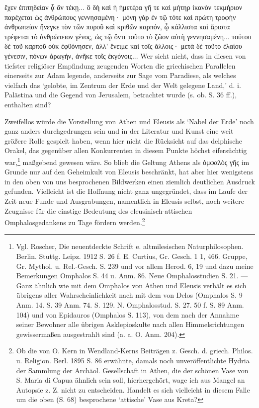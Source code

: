 \documentclass[a4paper, 11pt, oneside]{article}
\begin{document}
ἔχεν ἐπιτηδείαν ᾇ ἂν τέκῃ... ὃ δὴ καὶ ἡ ἡμετέρα γῆ τε καὶ μήτηρ ἱκανὸν τεκμήριον παρέχεται ὡς ἀνθρώπους γεννησαμένη· μόνη γὰρ ἐν τῷ τότε καὶ πρώτη τροφὴν ἀνθρωπείαν ἤνεγκε τὸν τῶν πυροῦ καὶ κριθῶν καρπόν, ᾧ κάλλιστα καὶ ἄριστα τρέφεται τὸ ἀνθρώπειον γένος, ὡς τῷ ὄντι τοῦτο τὸ ζῶον αὐτὴ γεννησαμένη... τούτου δὲ τοῦ καρποῦ οὐκ ἐφθόνησεν, ἀλλ' ἔνειμε καὶ τοῖς ἄλλοις· μετὰ δὲ τοῦτο ἐλαίου γένεσιν, πόνων ἀρωγήν, ἀνῆκε τοῖς ἐκγόνοις... Wer sieht nicht, dass in diesen von tiefster religiöser Empfindung zeugenden Worten die griechischen Parallelen einerseits zur Adam legende, anderseits zur Sage vom Paradiese, als welches vielfach das `gelobte, im Zentrum der Erde und der Welt gelegene Land,' d. i. Palästina und die Gegend von Jerusalem, betrachtet wurde (s. ob. S. 36 ff.), enthalten sind?

Zweifellos würde die Vorstellung von Athen und Eleusis als `Nabel der Erde' noch ganz anders durchgedrungen sein und in der Literatur und Kunst eine weit größere Rolle gespielt haben, wenn hier nicht die Rücksicht auf das delphische Orakel, das gegenüber allen Konkurrenten in diesem Punkte höchst eifersüchtig war,\footnote{Vgl. Roscher, Die neuentdeckte Schrift e. altmilesischen Naturphilosophen. Berlin. Stuttg. Leipz. 1912 S. 26 f. E. Curtius, Gr. Gesch. 1 1, 466. Gruppe, Gr. Mythol. u. Rel.-Gesch. S. 239 und vor allem Herod. 6, 19 und dazu meine Bemerkungen Omphalos S. 44 u. Anm. 86. Neue Omphalosstudien S. 21. --- Ganz ähnlich wie mit dem Omphalos von Athen und Eleusis verhält es sich übrigens aller Wahrscheinlichkeit nach mit dem von Delos (Omphalos S. 9 Anm. 14. S. 39 Anm. 74. S. 129. N. Omphalosstud. S. 27. 50 f. S. 89 Anm. 104) und von Epidauros (Omphalos S. 113), von dem nach der Annahme seiner Bewohner alle übrigen Asklepioskulte nach allen Himmelsrichtungen gewissermaßen ausgestrahlt sind (a. a. O. Anm. 204).} maßgebend gewesen wäre. So blieb die Geltung Athens als ὀμφαλὸς γῆς im Grunde nur auf den Geheimkult von Eleusis beschränkt, hat aber hier wenigstens in den oben von uns besprochenen Bildwerken einen ziemlich deutlichen Ausdruck gefunden. Vielleicht ist die Hoffnung nicht ganz ungegründet, dass im Laufe der Zeit neue Funde und Ausgrabungen, namentlich in Eleusis selbst, noch weitere Zeugnisse für die einstige Bedeutung des eleusinisch-attischen Omphalosgedankens zu Tage fördern werden.\footnote{Ob die von O. Kern in Wendland-Kerns Beiträgen z. Gesch. d. griech. Philos. u. Religion. Berl. 1895 S. 86 erwähnte, damals noch unveröffentlichte Hydria der Sammlung der Archäol. Gesellschaft in Athen, die der schönen Vase von S. Maria di Capua ähnlich sein soll, hierhergehört, wage ich aus Mangel an Autopsie z. Z. nicht zu entscheiden. Handelt es sich vielleicht in diesem Falle um die oben (S. 68) besprochene `attische' Vase aus Kreta?} 
\clearpage
\end{document}
